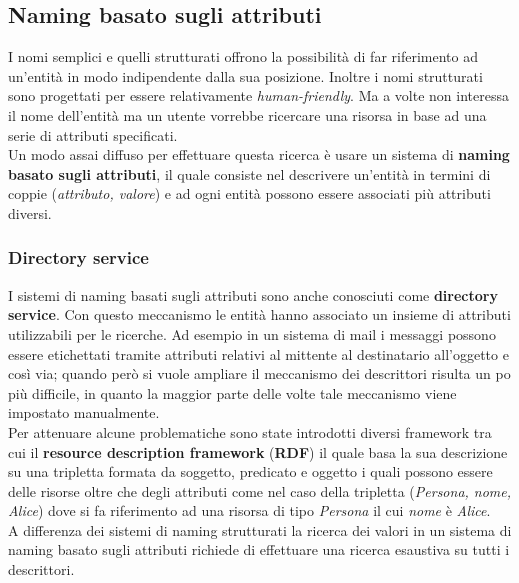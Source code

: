\subsection{Naming basato sugli attributi}
I nomi semplici e quelli strutturati offrono la possibilità di far riferimento ad un'entità in modo indipendente dalla sua posizione. Inoltre i nomi strutturati sono progettati per essere relativamente \emph{human-friendly}. Ma a volte non interessa il nome dell'entità ma un utente vorrebbe ricercare una risorsa in base ad una serie di attributi specificati.\\
Un modo assai diffuso per effettuare questa ricerca è usare un sistema di \textbf{naming basato sugli attributi}, il quale consiste nel descrivere un'entità in termini di coppie (\emph{attributo, valore}) e ad ogni entità possono essere associati più attributi diversi.
\subsubsection{Directory service}
I sistemi di naming basati sugli attributi sono anche conosciuti come \textbf{directory service}. Con questo meccanismo le entità hanno associato un insieme di attributi utilizzabili per le ricerche. Ad esempio in un sistema di mail i messaggi possono essere etichettati tramite attributi relativi al mittente al destinatario all'oggetto e così via; quando però si vuole ampliare il meccanismo dei descrittori risulta un po più difficile, in quanto la maggior parte delle volte tale meccanismo viene impostato manualmente.\\
Per attenuare alcune problematiche sono state introdotti diversi framework tra cui il \textbf{resource description framework} (\textbf{RDF}) il quale basa la sua descrizione su una tripletta formata da soggetto, predicato e oggetto i quali possono essere delle risorse oltre che degli attributi come nel caso della tripletta (\emph{Persona, nome, Alice}) dove si fa riferimento ad una risorsa di tipo \emph{Persona} il cui \emph{nome} è \emph{Alice}.\\
A differenza dei sistemi di naming strutturati la ricerca dei valori in un sistema di naming basato sugli attributi richiede di effettuare una ricerca esaustiva su tutti i descrittori.
